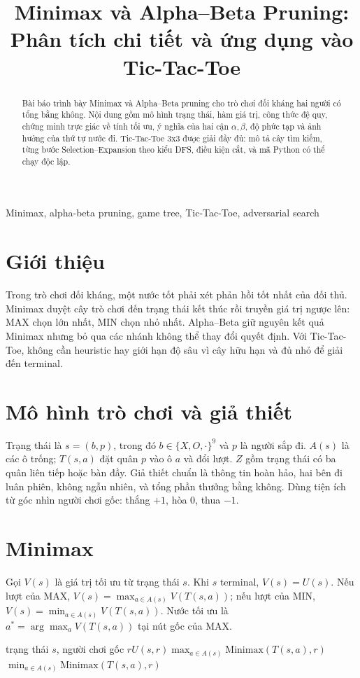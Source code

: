 \documentclass[conference]{IEEEtran}
\title{Minimax và Alpha--Beta Pruning: Phân tích chi tiết và ứng dụng vào Tic-Tac-Toe}
\author{\IEEEauthorblockN{Tên sinh viên}\IEEEauthorblockA{Bộ môn Trí tuệ nhân tạo\\Trường/Đơn vị}}
\begin{document}
\maketitle
\begin{abstract}Bài báo trình bày Minimax và Alpha--Beta pruning cho trò chơi đối kháng hai người có tổng bằng không. Nội dung gồm mô hình trạng thái, hàm giá trị, công thức đệ quy, chứng minh trực giác về tính tối ưu, ý nghĩa của hai cận $\alpha,\beta$, độ phức tạp và ảnh hưởng của thứ tự nước đi. Tic-Tac-Toe 3x3 được giải đầy đủ: mô tả cây tìm kiếm, từng bước Selection--Expansion theo kiểu DFS, điều kiện cắt, và mã Python có thể chạy độc lập.\end{abstract}
\begin{IEEEkeywords}Minimax, alpha-beta pruning, game tree, Tic-Tac-Toe, adversarial search\end{IEEEkeywords}
\section{Giới thiệu}Trong trò chơi đối kháng, một nước tốt phải xét phản hồi tốt nhất của đối thủ. Minimax duyệt cây trò chơi đến trạng thái kết thúc rồi truyền giá trị ngược lên: MAX chọn lớn nhất, MIN chọn nhỏ nhất. Alpha--Beta giữ nguyên kết quả Minimax nhưng bỏ qua các nhánh không thể thay đổi quyết định. Với Tic-Tac-Toe, không cần heuristic hay giới hạn độ sâu vì cây hữu hạn và đủ nhỏ để giải đến terminal.
\section{Mô hình trò chơi và giả thiết}Trạng thái là $s=(b,p)$, trong đó $b\in\{X,O,\cdot\}^9$ và $p$ là người sắp đi. $A(s)$ là các ô trống; $T(s,a)$ đặt quân $p$ vào ô $a$ và đổi lượt. $Z$ gồm trạng thái có ba quân liên tiếp hoặc bàn đầy. Giả thiết chuẩn là thông tin hoàn hảo, hai bên đi luân phiên, không ngẫu nhiên, và tổng phần thưởng bằng không. Dùng tiện ích từ góc nhìn người chơi gốc: thắng $+1$, hòa $0$, thua $-1$.
\section{Minimax}Gọi $V(s)$ là giá trị tối ưu từ trạng thái $s$. Khi $s$ terminal, $V(s)=U(s)$. Nếu lượt của MAX, $V(s)=\max_{a\in A(s)}V(T(s,a))$; nếu lượt của MIN, $V(s)=\min_{a\in A(s)}V(T(s,a))$. Nước tối ưu là $a^*=\arg\max_a V(T(s,a))$ tại nút gốc của MAX.\begin{algorithm}[h]\caption{Minimax đệ quy}\begin{algorithmic}[1]\Require trạng thái $s$, người chơi gốc $r$\State \Return $U(s,r)$\EndIf{}\State \Return $\max_{a\in A(s)}\mathrm{Minimax}(T(s,a),r)$\Else\State \Return $\min_{a\in A(s)}\mathrm{Minimax}(T(s,a),r)$\EndIf\end{algorithmic}\end{algorithm}
\end{document}
